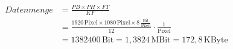 \begin{align}
		Datenmenge &= \frac{PB \times PH \times FT}{KF} \label{eq:Bilddatenmenge}\\
		&= \frac{1920\,\mathrm{Pixel}\times 1080\,\mathrm{Pixel} \times 8\,\frac{\mathrm{Bit}}{\mathrm{Pixel}}}{12} \cdot \frac{1}{\mathrm{Pixel}} \\
		&= 1382400\,\mathrm{Bit} = 1,3824\,\mathrm{MBit} = 172,8\,\mathrm{KByte}
\end{align}